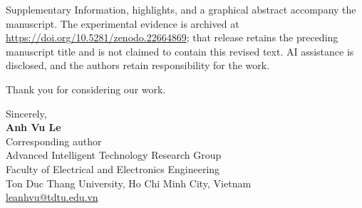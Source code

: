 \documentclass[11pt]{article}
\begin{document}
Supplementary Information, highlights, and a graphical abstract accompany the manuscript. The experimental evidence is archived at \url{https://doi.org/10.5281/zenodo.22664869}; that release retains the preceding manuscript title and is not claimed to contain this revised text. AI assistance is disclosed, and the authors retain responsibility for the work.

Thank you for considering our work.

Sincerely,\\[0.8em]
\textbf{Anh Vu Le}\\
Corresponding author\\
Advanced Intelligent Technology Research Group\\
Faculty of Electrical and Electronics Engineering\\
Ton Duc Thang University, Ho Chi Minh City, Vietnam\\
\href{mailto:leanhvu@tdtu.edu.vn}{leanhvu@tdtu.edu.vn}
\end{document}
